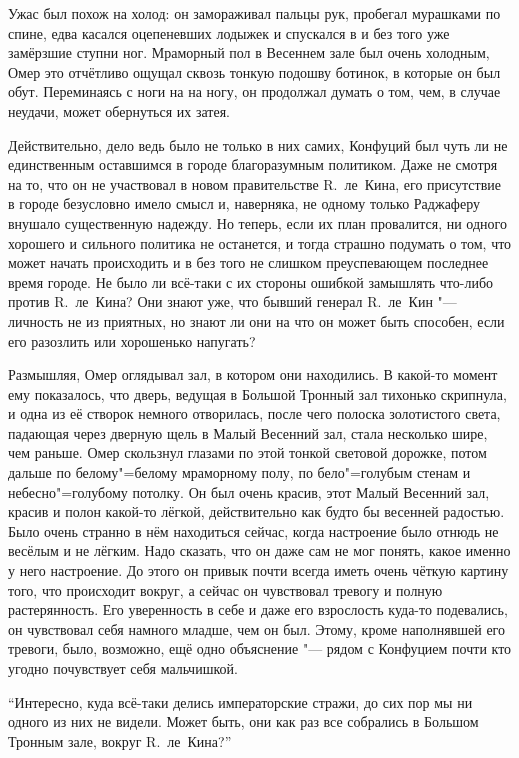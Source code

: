 Ужас был похож на холод: он замораживал пальцы рук, пробегал мурашками по спине,
едва касался оцепеневших лодыжек и спускался в и без того уже замёрзшие ступни
ног.
Мраморный пол в Весеннем зале был очень холодным, Омер это отчётливо ощущал
сквозь тонкую подошву ботинок, в которые он был обут.
Переминаясь с ноги на на ногу, он продолжал думать о том, чем, в случае неудачи,
может обернуться их затея.

Действительно, дело ведь было не только в них самих, Конфуций был чуть ли не
единственным оставшимся в городе благоразумным политиком.
Даже не смотря на то, что он не участвовал в новом правительстве R.~ле~Кина,
его присутствие в городе безусловно имело смысл и, наверняка, не одному только
Раджаферу внушало существенную надежду.
Но теперь, если их план провалится, ни одного хорошего и сильного политика не
останется, и тогда страшно подумать о том, что может начать происходить и в без
того не слишком преуспевающем последнее время городе.
Не было ли всё-таки с их стороны ошибкой замышлять что-либо против R.~ле~Кина?
Они знают уже, что бывший генерал R.~ле~Кин "--- личность не из приятных, но
знают ли они на что он может быть способен, если его разозлить или хорошенько
напугать?

Размышляя, Омер оглядывал зал, в котором они находились.
В какой-то момент ему показалось, что дверь, ведущая в Большой Тронный зал
тихонько скрипнула, и одна из её створок немного отворилась, после чего полоска
золотистого света, падающая через дверную щель в Малый Весенний зал, стала
несколько шире, чем раньше.
Омер скользнул глазами по этой тонкой световой дорожке, потом дальше по
белому"=белому мраморному полу, по бело"=голубым стенам и небесно"=голубому
потолку.
Он был очень красив, этот Малый Весенний зал, красив и полон какой-то лёгкой,
действительно как будто бы весенней радостью.
Было очень странно в нём находиться сейчас, когда настроение было отнюдь не
весёлым и не лёгким.
Надо сказать, что он даже сам не мог понять, какое именно у него настроение.
До этого он привык почти всегда иметь очень чёткую картину того, что происходит
вокруг, а сейчас он чувствовал тревогу и полную растерянность.
Его уверенность в себе и даже его взрослость куда-то подевались, он чувствовал
себя намного младше, чем он был.
Этому, кроме наполнявшей его тревоги, было, возможно, ещё одно объяснение "---
рядом с Конфуцием почти кто угодно почувствует себя мальчишкой.

\enquote{Интересно, куда всё-таки делись императорские стражи, до сих пор мы ни
одного из них не видели.
Может быть, они как раз все собрались в Большом Тронным зале, вокруг R.~ле~Кина?}

